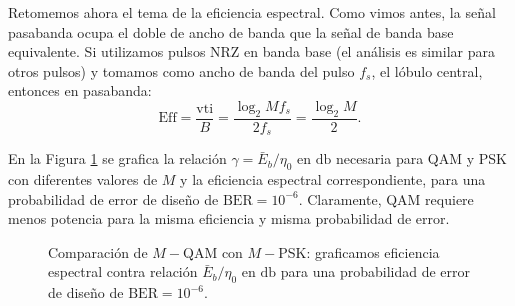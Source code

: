 Retomemos ahora el tema de la eficiencia espectral. Como vimos antes, la señal pasabanda ocupa el doble de ancho de banda que la señal de banda base equivalente. Si utilizamos pulsos NRZ en banda base (el análisis es similar para otros pulsos) y tomamos como ancho de banda del pulso $f_s$, el lóbulo central, entonces en pasabanda:
\begin{equation*}
    \mathrm{Eff} = \frac{\mathrm{vti}}{B} = \frac{\log_2 M f_s}{2f_s} = \frac{\log_2 M}{2}.
\end{equation*}

En la Figura \ref{fig:comparacion qam psk} se grafica la relación $\gamma=\bar{E}_b/\eta_0$ en $\unit{\decibel}$ necesaria para QAM y PSK con diferentes valores de $M$ y la eficiencia espectral correspondiente, para una probabilidad de error de diseño de $\mathrm{BER}=10^{-6}$. Claramente, QAM requiere menos potencia para la misma eficiencia y misma probabilidad de error.

\begin{figure}
    \begin{center}
    \end{center}
    \caption{Comparación de $M-$QAM con $M-$PSK: graficamos eficiencia espectral contra relación $\bar{E}_b/\eta_0$ en $\unit{\decibel}$ para una probabilidad de error de diseño de $\mathrm{BER}=10^{-6}$.}\label{fig:comparacion qam psk}
\end{figure}